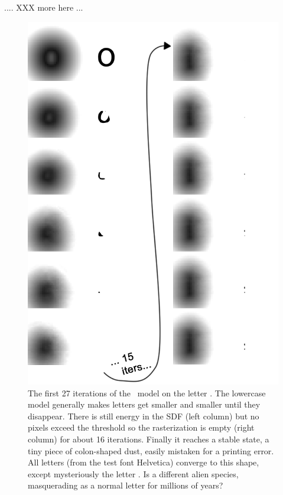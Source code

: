 \documentclass[twocolumn]{article}
\begin{document}
.... XXX more here ...

\begin{figure}[t]
\centering
  \includegraphics[width=0.80 \linewidth]{lowestcaseo}
  \caption{ The first 27 iterations of the \makelowercase\ model on
    the letter . The lowercase model generally makes
    letters get smaller and smaller until they disappear. There is
    still energy in the SDF (left column) but no pixels exceed the
    threshold so the rasterization is empty (right column) for about
    16 iterations. Finally it reaches a stable state, a tiny piece of
    colon-shaped dust, easily mistaken for a printing error. All
    letters (from the test font Helvetica) converge to this shape,
    except mysteriously the letter . Is  a
    different alien species, masquerading as a normal letter for
    millions of years? } \label{fig:lowestcaseo}
\end{figure}



\end{document}
